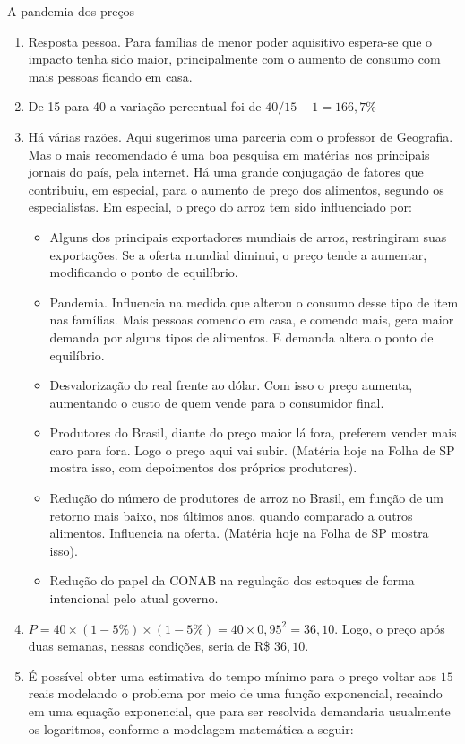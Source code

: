 \begin{answer}{A pandemia dos preços}
{
\begin{enumerate}
\item Resposta pessoa. Para famílias de menor poder aquisitivo espera-se que o impacto tenha sido maior, principalmente com o aumento de consumo com mais pessoas ficando em casa.
\item De 15 para 40 a variação percentual foi de $40/15-1=166{,}7\%$
\item 
Há várias razões. Aqui sugerimos uma parceria com o professor de Geografia. Mas o mais recomendado é uma boa pesquisa em matérias nos principais jornais do país, pela internet. Há uma grande conjugação de fatores que contribuiu, em especial, para o aumento de preço dos alimentos, segundo os especialistas. Em especial, o preço do arroz tem sido influenciado por:

\begin{itemize}
\item Alguns dos principais exportadores mundiais de arroz, restringiram suas exportações. Se a oferta mundial diminui, o preço tende a aumentar, modificando o ponto de equilíbrio. 

\item Pandemia. Influencia na medida que alterou o consumo desse tipo de item nas famílias. Mais pessoas comendo em casa, e comendo mais, gera maior demanda por alguns tipos de alimentos. E demanda altera o ponto de equilíbrio. 

\item Desvalorização do real frente ao dólar. Com isso o preço aumenta, aumentando o custo de quem vende para o consumidor final. 

\item Produtores do Brasil, diante do preço maior lá fora, preferem vender mais caro para fora. Logo o preço aqui vai subir. (Matéria hoje na Folha de SP mostra isso, com depoimentos dos próprios produtores).

\item Redução do número de produtores de arroz no Brasil, em função de um retorno mais baixo, nos últimos anos, quando comparado a outros alimentos. Influencia na oferta. (Matéria hoje na Folha de SP mostra isso).

\item Redução do papel da CONAB na regulação dos estoques de forma intencional pelo atual governo.
\end{itemize}
\clearpage
\item $P=40\times(1-5\%)\times(1-5\%)=40\times0{,}95^2=36{,}10$. Logo, o preço após duas semanas, nessas condições, seria de R\$ $36{,}10$.
\item É possível obter uma estimativa do tempo mínimo para o preço voltar aos $15$ reais modelando o problema por meio de uma função exponencial, recaindo em uma equação exponencial, que para ser resolvida demandaria usualmente os logaritmos, conforme a modelagem matemática a seguir:


\end{enumerate}}
\end{answer}
